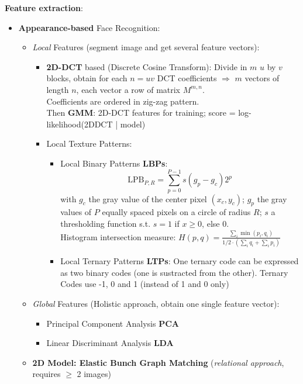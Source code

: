 \documentclass[a4paper]{article}
\begin{document}
      \textbf{Feature extraction}:
      \begin{itemize}
        \item \textbf{Appearance-based} Face Recognition:
          \begin{itemize}
            \item \emph{Local} Features (segment image and get several feature vectors):
              \begin{itemize}
                \item \textbf{2D-DCT} based (Discrete Cosine Transform): Divide in $m$ $u$ by $v$ blocks, obtain for each $n=uv$ DCT coefficients $\Rightarrow$ $m$ vectors of length $n$, each vector a row of matrix $M^{m,n}$.\\Coefficients are ordered in zig-zag pattern.\\
                Then \textbf{GMM}: 2D-DCT features for training; score = log-likelihood(2DDCT | model)
                \item Local Texture Patterns:
                \begin{itemize}
                  \item Local Binary Patterns \textbf{LBPs}:
                  $$\text{LPB}_{P,R}=\sum_{p=0}^{P-1}{s(g_p-g_c)2^p}$$
                  with $g_c$ the gray value of the center pixel $(x_c, y_c)$; $g_p$ the gray values of $P$ equally spaced pixels on a circle of radius $R$; $s$ a thresholding function s.t. $s=1$ if $x\geq 0$, else 0.\\
                  Histogram intersection measure: $H(p,q)=\frac{\sum_i{\min{(p_i, q_i)}}}{1/2\cdot(\sum_i{q_i}+\sum_i{p_i})}$
                  \item Local Ternary Patterns \textbf{LTPs}: One ternary code can be expressed as two binary codes (one is sustracted from the other). Ternary Codes use -1, 0 and 1 (instead of 1 and 0 only)
                \end{itemize}
              \end{itemize}
            \item \emph{Global} Features (Holistic approach, obtain one single feature vector):
              \begin{itemize}
                \item Principal Component Analysis \textbf{PCA}
                \item Linear Discriminant Analysis \textbf{LDA}
              \end{itemize}
            \item \textbf{2D Model: Elastic Bunch Graph Matching} (\emph{relational approach}, requires $\geq$ 2 images)

\end{itemize}
\end{itemize}
\end{document}
